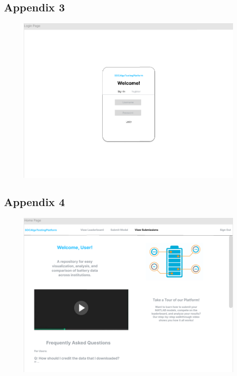 \documentclass[12pt, titlepage]{article}
\begin{document}
\subsection{Appendix 3} \label{Appendix 3}
\begin{figure}[H]
    \centering
    \includegraphics[width=1\linewidth]{.//Interface/Login.png}
\end{figure}
\subsection{Appendix 4} \label{Appendix 4}
\begin{figure}[H]
    \centering
    \includegraphics[width=1\linewidth]{Interface/Home.png}
\end{figure}
\end{document}
